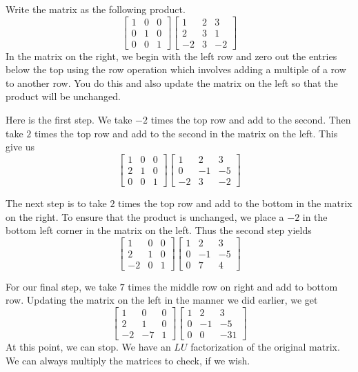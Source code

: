 \documentclass{ximera}
\begin{document}
\begin{explanation}
Write the matrix as the following product.
\[
\begin{bmatrix}
1 & 0 & 0 \\
0 & 1 & 0 \\
0 & 0 & 1
\end{bmatrix} 
\begin{bmatrix}
1 & 2 & 3 \\
2 & 3 & 1 \\
-2 & 3 & -2
\end{bmatrix} 
\]
In the matrix on the right, we begin with the left row and zero
out the entries below the top using the row operation which involves adding a multiple of a row to another row. You do this and also update the matrix on the left so that the product will be unchanged. 

Here is the first step.  We take $-2$ times the top row and add to the second. Then take $2$ times the top row and add to the second in the matrix on the left.  This give us
\[
\begin{bmatrix}
1 & 0 & 0 \\
2 & 1 & 0 \\
0 & 0 & 1
\end{bmatrix} 
\begin{bmatrix}
1 & 2 & 3 \\
0 & -1 & -5 \\
-2 & 3 & -2
\end{bmatrix} 
\]

The next step is to take $2$ times the top row and add to the bottom in the matrix on the right. To ensure that the product is unchanged, we place a $-2$ in the bottom left corner in the matrix on the left. Thus the second step yields
\[
\begin{bmatrix}
1 & 0 & 0 \\
2 & 1 & 0 \\
-2 & 0 & 1
\end{bmatrix} 
\begin{bmatrix}
1 & 2 & 3 \\
0 & -1 & -5 \\
0 & 7 & 4
\end{bmatrix} 
\]

For our final step, we take $7$ times the middle row on right and add to bottom row. Updating the matrix on the left in the manner we did earlier, we get
\[
\begin{bmatrix}
1 & 0 & 0 \\
2 & 1 & 0 \\
-2 & -7 & 1
\end{bmatrix} 
\begin{bmatrix}
1 & 2 & 3 \\
0 & -1 & -5 \\
0 & 0 & -31
\end{bmatrix} 
\]
At this point, we can stop. We have an $LU$ factorization of the original matrix.  We can always multiply the matrices to check, if we wish.
\end{explanation}
\end{document}
